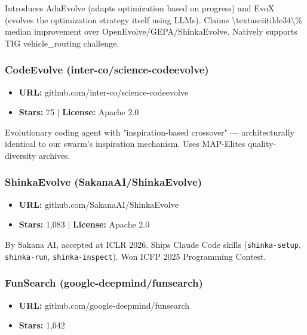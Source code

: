 \documentclass[twocolumn,10pt,letterpaper]{article}
\begin{document}
Introduces AdaEvolve (adapts optimization based on progress) and EvoX (evolves the optimization strategy itself using LLMs). Claims \textbackslash{}textasciitilde34\textbackslash{}\% median improvement over OpenEvolve/GEPA/ShinkaEvolve. Natively supports TIG vehicle\_routing challenge.


\subsubsection{CodeEvolve (inter-co/science-codeevolve)}

\begin{itemize}
\setlength{\itemsep}{0pt}
\setlength{\parskip}{0pt}
  \item \textbf{URL:} github.com/inter-co/science-codeevolve
  \item \textbf{Stars:} 75 | \textbf{License:} Apache 2.0
\end{itemize}

Evolutionary coding agent with "inspiration-based crossover" --- architecturally identical to our swarm's inspiration mechanism. Uses MAP-Elites quality-diversity archives.


\subsubsection{ShinkaEvolve (SakanaAI/ShinkaEvolve)}

\begin{itemize}
\setlength{\itemsep}{0pt}
\setlength{\parskip}{0pt}
  \item \textbf{URL:} github.com/SakanaAI/ShinkaEvolve
  \item \textbf{Stars:} 1,083 | \textbf{License:} Apache 2.0
\end{itemize}

By Sakana AI, accepted at ICLR 2026. Ships Claude Code skills (\texttt{shinka-\allowbreak setup}, \texttt{shinka-\allowbreak run}, \texttt{shinka-\allowbreak inspect}). Won ICFP 2025 Programming Contest.


\subsubsection{FunSearch (google-deepmind/funsearch)}

\begin{itemize}
\setlength{\itemsep}{0pt}
\setlength{\parskip}{0pt}
  \item \textbf{URL:} github.com/google-deepmind/funsearch
  \item \textbf{Stars:} 1,042
\end{itemize}
\end{document}

